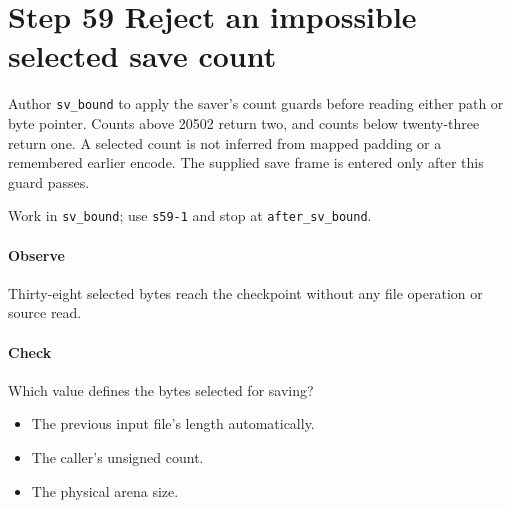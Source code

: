 \section{Step 59 Reject an impossible selected save count}\label{qoi-s59}
Author \texttt{sv\_bound} to apply the saver’s count guards before reading either path or byte pointer. Counts above 20502 return two, and counts below twenty-three return one. A selected count is not inferred from mapped padding or a remembered earlier encode. The supplied save frame is entered only after this guard passes.

Work in \texttt{sv\_bound}; use \texttt{s59-1} and stop at \texttt{after\_sv\_bound}.

\paragraph{Observe} Thirty-eight selected bytes reach the checkpoint without any file operation or source read.

\paragraph{Check} Which value defines the bytes selected for saving?
\begin{itemize}
  \item[A.] The previous input file’s length automatically.
  \item[B.] The caller’s unsigned count.
  \item[C.] The physical arena size.
\end{itemize}
